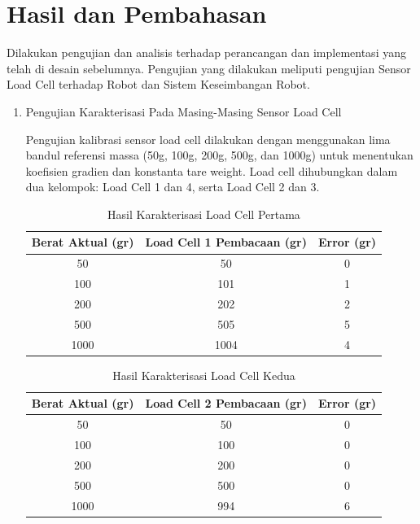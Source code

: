 \section{Hasil dan Pembahasan}
\label{sec:hasildanpembahasan}

Dilakukan pengujian dan analisis terhadap perancangan dan implementasi yang telah di desain sebelumnya. Pengujian yang dilakukan meliputi pengujian Sensor Load Cell terhadap Robot dan Sistem Keseimbangan Robot. 

\begin{enumerate}[label=\Alph*.]

    \item Pengujian Karakterisasi Pada Masing-Masing Sensor Load Cell
    \label{subsec:hasil-pembahasan-karakterisasi}

        \hspace*{1em} Pengujian kalibrasi sensor load cell dilakukan dengan menggunakan lima bandul referensi massa (50g, 100g, 200g, 500g, dan 1000g) untuk menentukan koefisien gradien dan konstanta tare weight. Load cell dihubungkan dalam dua kelompok: Load Cell 1 dan 4, serta Load Cell 2 dan 3. 

        \begin{table}[h]
            \centering
            \caption{Hasil Karakterisasi Load Cell Pertama}
            \begin{tabular}{|c|c|c|}
                \hline
                \textbf{Berat Aktual (gr)} & \textbf{Load Cell 1 Pembacaan (gr)} & \textbf{Error (gr)} \\
                \hline
                50    & 50    & 0   \\
                100   & 101   & 1   \\
                200   & 202   & 2   \\
                500   & 505   & 5   \\
                1000  & 1004  & 4   \\
                \hline
            \end{tabular}
            \label{tab:Kalibrasi_Load_Cell_1}
        \end{table}

        \begin{table}[h]
            \centering
            \caption{Hasil Karakterisasi Load Cell Kedua}
            \begin{tabular}{|c|c|c|}
                \hline
                \textbf{Berat Aktual (gr)} & \textbf{Load Cell 2 Pembacaan (gr)} & \textbf{Error (gr)} \\
                \hline
                50        & 50        & 0   \\
                100       & 100       & 0   \\
                200       & 200       & 0   \\
                500       & 500       & 0   \\
                1000      & 994       & 6   \\           
                \hline
        \end{tabular}
        \label{tab:Kalibrasi_Load_Cell_2}
        \end{table}


\end{enumerate}
